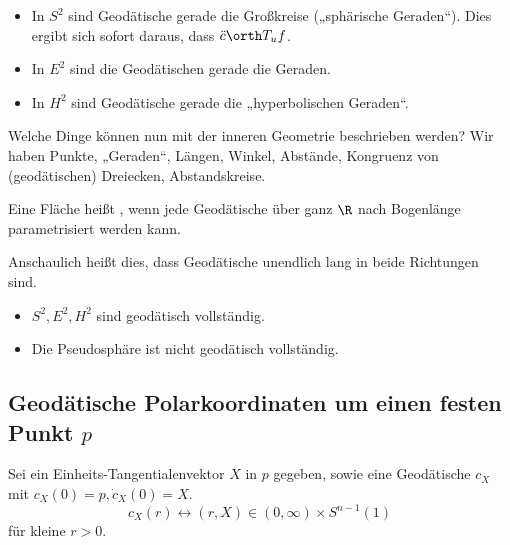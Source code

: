 \begin{ex}
	\begin{itemize}
		\item
			In $S^2$ sind Geodätische gerade die Großkreise („sphärische Geraden“).
			Dies ergibt sich sofort daraus, dass $\ddot c \orth T_u f$.
		\item
			In $E^2$ sind die Geodätischen gerade die Geraden.
		\item
			In $H^2$ sind Geodätische gerade die „hyperbolischen Geraden“.
	\end{itemize}
\end{ex}

Welche Dinge können nun mit der inneren Geometrie beschrieben werden?
Wir haben Punkte, „Geraden“, Längen, Winkel, Abstände, Kongruenz von (geodätischen) Dreiecken, Abstandskreise.

\begin{df}
	Eine Fläche heißt , wenn jede Geodätische über ganz $\R$ nach Bogenlänge parametrisiert werden kann.
	\begin{note}
		Anschaulich heißt dies, dass Geodätische unendlich lang in beide Richtungen sind.
	\end{note}
\end{df}

\begin{ex}
	\begin{itemize}
		\item
			$S^2, E^2, H^2$ sind geodätisch vollständig.
		\item
			Die Pseudosphäre ist nicht geodätisch vollständig.
	\end{itemize}
\end{ex}

\subsection{Geodätische Polarkoordinaten um einen festen Punkt \texorpdfstring{$p$}{p}}

Sei ein Einheits-Tangentialenvektor $X$ in $p$ gegeben, sowie eine Geodätische $c_X$ mit $c_X(0) = p, \dot c_X(0) = X$.
\[
	c_X(r) \leftrightarrow (r,X) \in (0, \infty) \times S^{n-1}(1)
\]
für kleine $r > 0$.

